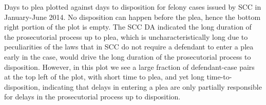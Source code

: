 Days to plea plotted against days to disposition for felony cases issued by SCC in January-June 2014. No disposition can happen before the plea, hence the bottom right portion of the plot is empty. The SCC DA indicated the long duration of the prosecutorial process up to plea, which is uncharacteristically long due to peculiarities of the laws that in SCC do not require a defendant to enter a plea early in the case, would drive the long duration of the prosecutorial process to disposition. However, in this plot we see a large fraction of defendant-case pairs at the top left of the plot, with short time to plea, and yet long time-to-disposition, indicating that delays in entering a plea are only partially responsible for delays in the prosecutorial process up to disposition.
\label{fig:PleaVsDisposition}